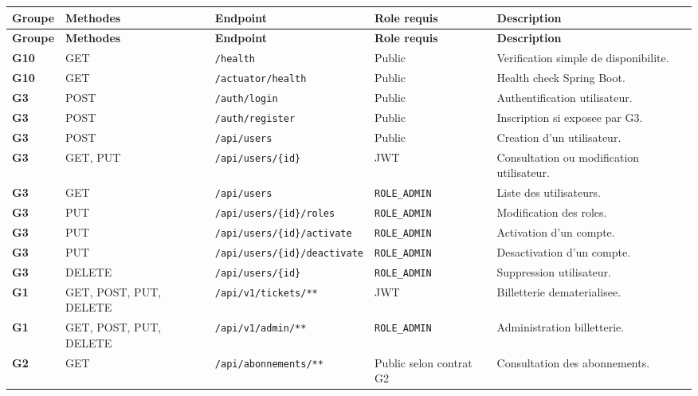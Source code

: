 \documentclass[12pt, a4paper]{article}
\begin{document}
\begin{center}
\begin{longtable}{>{\bfseries}p{1.7cm} p{2.2cm} p{4.3cm} p{3cm} p{3.4cm}}
\rowcolor{navyblue}
\color{white}\textbf{Groupe} & \color{white}\textbf{Methodes} & \color{white}\textbf{Endpoint} & \color{white}\textbf{Role requis} & \color{white}\textbf{Description} \\
\endfirsthead
\rowcolor{navyblue}
\color{white}\textbf{Groupe} & \color{white}\textbf{Methodes} & \color{white}\textbf{Endpoint} & \color{white}\textbf{Role requis} & \color{white}\textbf{Description} \\
\endhead
G10 & GET & \texttt{/health} & Public & Verification simple de disponibilite. \\
\rowcolor{lightgray}
G10 & GET & \texttt{/actuator/health} & Public & Health check Spring Boot. \\
G3 & POST & \texttt{/auth/login} & Public & Authentification utilisateur. \\
\rowcolor{lightgray}
G3 & POST & \texttt{/auth/register} & Public & Inscription si exposee par G3. \\
G3 & POST & \texttt{/api/users} & Public & Creation d'un utilisateur. \\
\rowcolor{lightgray}
G3 & GET, PUT & \texttt{/api/users/\{id\}} & JWT & Consultation ou modification utilisateur. \\
G3 & GET & \texttt{/api/users} & \texttt{ROLE\_ADMIN} & Liste des utilisateurs. \\
\rowcolor{lightgray}
G3 & PUT & \texttt{/api/users/\{id\}/roles} & \texttt{ROLE\_ADMIN} & Modification des roles. \\
G3 & PUT & \texttt{/api/users/\{id\}/activate} & \texttt{ROLE\_ADMIN} & Activation d'un compte. \\
\rowcolor{lightgray}
G3 & PUT & \texttt{/api/users/\{id\}/deactivate} & \texttt{ROLE\_ADMIN} & Desactivation d'un compte. \\
G3 & DELETE & \texttt{/api/users/\{id\}} & \texttt{ROLE\_ADMIN} & Suppression utilisateur. \\
\rowcolor{lightgray}
G1 & GET, POST, PUT, DELETE & \texttt{/api/v1/tickets/**} & JWT & Billetterie dematerialisee. \\
G1 & GET, POST, PUT, DELETE & \texttt{/api/v1/admin/**} & \texttt{ROLE\_ADMIN} & Administration billetterie. \\
\rowcolor{lightgray}
G2 & GET & \texttt{/api/abonnements/**} & Public selon contrat G2 & Consultation des abonnements. \\

\end{longtable}
\end{center}
\end{document}
